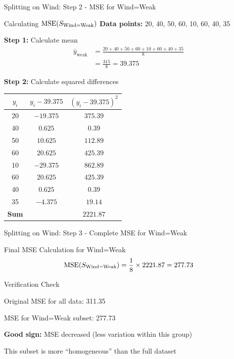 \documentclass[usenames,dvipsnames]{beamer}
\begin{document}
\begin{frame}{Splitting on Wind: Step 2 - MSE for Wind=Weak}
\small
\begin{examplebox}{Calculating $\operatorname{MSE}(S_{\text{Wind=Weak}})$}
\textbf{Data points:} 20, 40, 50, 60, 10, 60, 40, 35

\pause
\textbf{Step 1:} Calculate mean
\begin{align*}
\bar{y}_{\text{weak}} &= \frac{20 + 40 + 50 + 60 + 10 + 60 + 40 + 35}{8} \\
&= \frac{315}{8} = 39.375    
\end{align*}

\pause
\textbf{Step 2:} Calculate squared differences
\scriptsize
\begin{tabular}{|c|c|c|}
\hline
$y_i$ & $y_i - 39.375$ & $(y_i - 39.375)^2$ \\ \hline
20 & $-19.375$ & $375.39$ \\
40 & $0.625$ & $0.39$ \\
50 & $10.625$ & $112.89$ \\
60 & $20.625$ & $425.39$ \\
10 & $-29.375$ & $862.89$ \\
60 & $20.625$ & $425.39$ \\
40 & $0.625$ & $0.39$ \\
35 & $-4.375$ & $19.14$ \\ \hline
\textbf{Sum} & & $\mathbf{2221.87}$ \\
\hline
\end{tabular}
\end{examplebox}
\end{frame}

\begin{frame}{Splitting on Wind: Step 3 - Complete MSE for Wind=Weak}
\begin{examplebox}{Final MSE Calculation for Wind=Weak}
\[
\operatorname{MSE}(S_{\text{Wind=Weak}}) = \frac{1}{8} \times 2221.87 = 277.73
\]
\end{examplebox}

\pause
\begin{examplebox}{Verification Check}
\cleanitemize
{
    \item Original MSE for all data: 311.35
    \item MSE for Wind=Weak subset: 277.73
    \item \textbf{Good sign:} MSE decreased (less variation within this group)
    \item This subset is more ``homogeneous'' than the full dataset
}
\end{examplebox}
\end{frame}
\end{document}
